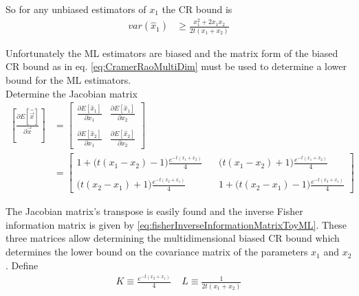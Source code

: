 \documentclass[report,12pt]{report}
\begin{document}
So for any unbiased estimators of $x_1$ the CR bound is
\begin{align}
	var(\hat x_1) &\geq \frac{x_1^2 + 2 x_1 x_2}{2t(x_1 + x_2)}
	\label{eq:crunbiased}
\end{align}

Unfortunately the ML estimators are biased and the matrix form of the biased CR bound as in eq. \ref{eq:CramerRaoMultiDim} must be used to determine a lower bound for the ML estimators.\\ 

Determine the Jacobian matrix
\begin{align}
	\left[ \frac{\partial E[\hat{\vec x}]}{\partial \vec x} \right] &= 
	\left[ \begin{array}{cc} 
	\frac{\partial E[\hat x_1]}{\partial x_1}
	&
	\frac{\partial E[\hat x_1]}{\partial x_2}
	\\
	\\
	\frac{\partial E[\hat x_2]}{\partial x_1}
	&
	\frac{\partial E[\hat x_2]}{\partial x_2}
	\end{array} \right]
	\nonumber\\
	&= 
	\left[ \begin{array}{cc}
	1 + \big(t(x_1-x_2)-1\big)\frac{e^{-t(x_1+x_2)}}{4}\ \ \ \
	&
	\big(t(x_1-x_2)+1\big)\frac{e^{-t(x_1+x_2)}}{4}
	\\
	\\
	\big(t(x_2-x_1)+1\big)\frac{e^{-t(x_2+x_1)}}{4}\ \ \ \
	&
	1 + \big(t(x_2-x_1)-1\big)\frac{e^{-t(x_2+x_1)}}{4}
	\end{array} \right]
\end{align}

The Jacobian matrix's transpose is easily found and the inverse Fisher information matrix is given by \ref{eq:fisherInverseInformationMatrixToyML}. These three matrices allow determining the multidimensional biased CR bound which determines the lower bound on the covariance matrix of the parameters $x_1$ and $x_2$. Define
\begin{align}
	K \equiv \frac{e^{-t(x_2+x_1)}}{4}\ \ \ \ \
	L \equiv \frac{1}{2t(x_1 + x_2)}
\end{align}
\end{document}
